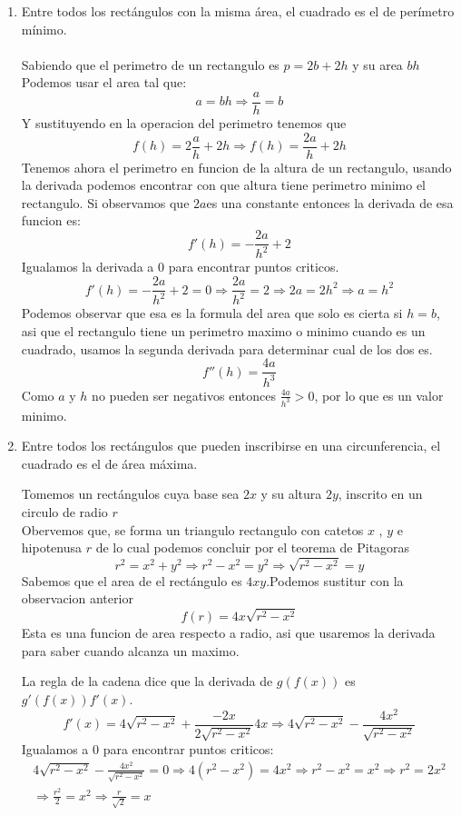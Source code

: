 \documentclass[12pt]{article}
\begin{document}
\begin{enumerate}[\hspace{9px} a)]
    \item Entre todos los rect\'angulos con la misma \'area, el cuadrado es el de per\'imetro m\'inimo.\\ \\
    Sabiendo que el perimetro de un rectangulo es \(p=2b+2h\) y su area \(bh\)
    Podemos usar el area tal que: \[a=bh\Rightarrow \displaystyle\frac{a}{h}=b\]
    Y sustituyendo en la operacion del perimetro tenemos que \[f(h)=2\displaystyle\frac{a}{h}+2h\Rightarrow f(h)=\displaystyle\frac{2a}{h}+2h\]
    Tenemos ahora el perimetro en funcion de la altura de un rectangulo, usando la derivada podemos encontrar con que altura tiene perimetro minimo el rectangulo. Si observamos que \(2a\)es una constante entonces la derivada de esa funcion es: 
    \[f'(h)=-\displaystyle\frac{2a}{h^2}+2\]
    Igualamos la derivada a 0 para encontrar puntos criticos.
    \[f'(h)=-\displaystyle\frac{2a}{h^2}+2=0\Rightarrow \displaystyle\frac{2a}{h^2}=2\Rightarrow 2a=2h^2\Rightarrow a=h^2\]
    Podemos observar que esa es la formula del area que solo es cierta si \(h=b\), asi que el rectangulo tiene un perimetro maximo o minimo cuando es un cuadrado, usamos la segunda derivada para determinar cual de los dos es.
    \[f''(h)=\displaystyle\frac{4a}{h^3}\]
    Como \(a\) y \(h\) no pueden ser negativos entonces \(\displaystyle\frac{4a}{h^3}>0\), por lo que es un valor minimo.\medskip

    \item Entre todos los rect\'angulos que pueden inscribirse en una circunferencia, el cuadrado es el de \'area m\'axima.\medskip
    
    Tomemos un rect\'angulos cuya base sea \(2x\) y su altura \(2y\), inscrito en un circulo de radio \(r\)\\
    Obervemos que, se forma un triangulo rectangulo con catetos \(x\) , \(y\) e hipotenusa \(r\) de lo cual podemos concluir por el teorema de Pitagoras 
    \[r^2=x^2+y^2\Rightarrow r^2-x^2=y^2\Rightarrow \sqrt{r^2-x^2}=y\]
    Sabemos que el area de el rect\'angulo es \(4xy\).\quad Podemos sustitur con la observacion anterior
    \[f(r)=4x\sqrt{r^2-x^2}\]
    Esta es una funcion de area respecto a radio, asi que usaremos la derivada para saber cuando alcanza un maximo.\medskip
    
    La regla de la cadena dice que la derivada de \(g(f(x))\) es \(g'(f(x))f'(x)\).
    \[f'(x)=4\sqrt{r^2-x^2}+\displaystyle\frac{-2x}{2\sqrt{r^2-x^2}}4x\Rightarrow 4\sqrt{r^2-x^2}-\displaystyle\frac{4x^2}{\sqrt{r^2-x^2}}\]
    Igualamos a 0 para encontrar puntos criticos:
    \begin{multline*}
        4\sqrt{r^2-x^2}-\displaystyle\frac{4x^2}{\sqrt{r^2-x^2}}=0\Rightarrow 4(r^2-x^2)=4x^2\Rightarrow r^2-x^2=x^2\Rightarrow r^2=2x^2\\
        \Rightarrow \displaystyle\frac{r^2}{2}=x^2\Rightarrow \displaystyle\frac{r}{\sqrt{2}}=x
    \end{multline*}


\end{enumerate}
\end{document}
